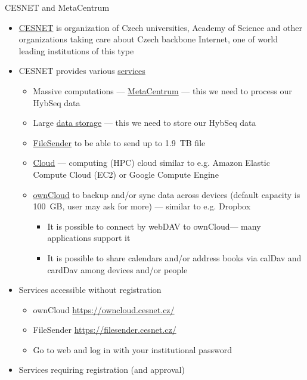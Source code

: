 \documentclass[compress, ucs, xelatex, 11pt, xcolor=x11names, aspectratio=169,
	hyperref={
		bookmarks=true,
		unicode=true,
		colorlinks=true,
		pdftitle={HybSeq course},
		plainpages=false,
		pdfauthor={Vojtech Zeisek},
		pdfsubject={Practical processing of HybSeq target enrichment sequencing data on computing grids like MetaCentrum},
		pdfcreator={XeLaTeX},
		pdfkeywords={BASH, command line, GNU, HybSeq, Linux, MetaCentrum, sequencing shell, target enrichment},
		linkcolor=Cyan2, %
		anchorcolor=Firebrick2, %
		citecolor=Firebrick2, %
		filecolor=Firebrick2, %
		menucolor=Firebrick2, %
		urlcolor=Chartreuse2, %
		pdftex},
	url={hyphens, lowtilde} %
	]{beamer}
\renewcommand{\alert}[1]{\textcolor{OrangeRed2}{#1}}
\begin{document}
\begin{frame}[allowframebreaks]{CESNET and MetaCentrum}
	\label{CESNET}
	\begin{itemize}
		\item \href{https://www.cesnet.cz/?lang=en}{CESNET} is organization of Czech universities, Academy of Science and other organizations taking care about Czech backbone Internet, one of world leading institutions of this type
		\item CESNET provides various \href{https://www.cesnet.cz/services/?lang=en}{services}
		\begin{itemize}
			\item Massive computations --- \href{https://www.cesnet.cz/services/massive-computations-metacentrum/?lang=en}{MetaCentrum} --- \alert{this we need to process our HybSeq data}
			\item Large \href{https://www.cesnet.cz/services/data-storage/?lang=en}{data storage} --- \alert{this we need to store our HybSeq data}
			\item \href{https://www.cesnet.cz/services/filesender/?lang=en}{FileSender} to be able to send up to 1.9~TB file
			\item \href{https://www.metacentrum.cz/en/Sluzby/Cloud/}{Cloud} --- computing (HPC) cloud similar to e.g. Amazon Elastic Compute Cloud (EC2) or Google Compute Engine
			\item \href{https://www.cesnet.cz/services/owncloud/?lang=en}{ownCloud} to backup and/or sync data across devices (default capacity is 100~GB, user may ask for more) --- similar to e.g. Dropbox
			\begin{itemize}
				\item It is possible to connect by webDAV to ownCloud--- many applications support it
				\item It is possible to share calendars and/or address books via calDav and cardDav among devices and/or people
			\end{itemize}
		\end{itemize}
		\item Services accessible without registration
		\begin{itemize}
			\item ownCloud \url{https://owncloud.cesnet.cz/}
			\item FileSender \url{https://filesender.cesnet.cz/}
			\item Go to web and log in with your institutional password
		\end{itemize}
		\item Services requiring registration (and approval)

\end{itemize}
\end{frame}
\end{document}
